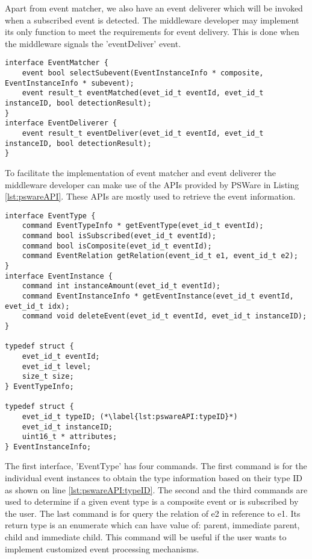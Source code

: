 Apart from event matcher, we also have an event deliverer which will be invoked when a subscribed event is detected. The middleware developer may implement its only function to meet the requirements for event delivery. This is done when the middleware signals the 'eventDeliver' event.
\begin{lstlisting}[caption=The event matcher interface, label=lst:pswareEventMatcher]
interface EventMatcher {
	event bool selectSubevent(EventInstanceInfo * composite, EventInstanceInfo * subevent);
	event result_t eventMatched(evet_id_t eventId, evet_id_t instanceID, bool detectionResult);
}
interface EventDeliverer {
	event result_t eventDeliver(evet_id_t eventId, evet_id_t instanceID, bool detectionResult);
}
\end{lstlisting}

To facilitate the implementation of event matcher and event deliverer the middleware developer can make use of the APIs provided by PSWare in Listing \ref{lst:pswareAPI}. These APIs are mostly used to retrieve the event information.
\begin{lstlisting}[caption=PSWare API in NesC, label=lst:pswareAPI]
interface EventType {
	command EventTypeInfo * getEventType(evet_id_t eventId);
	command bool isSubscribed(evet_id_t eventId);
	command bool isComposite(evet_id_t eventId);
	command EventRelation getRelation(event_id_t e1, event_id_t e2);
}
interface EventInstance {
	command int instanceAmount(evet_id_t eventId);
	command EventInstanceInfo * getEventInstance(evet_id_t eventId, evet_id_t idx);
	command void deleteEvent(evet_id_t eventId, evet_id_t instanceID);
}

typedef struct {
	evet_id_t eventId;
	evet_id_t level;
	size_t size;
} EventTypeInfo;

typedef struct {
	evet_id_t typeID; (*\label{lst:pswareAPI:typeID}*)
	evet_id_t instanceID;
	uint16_t * attributes;
} EventInstanceInfo;
\end{lstlisting}

The first interface, 'EventType' has four commands. The first command is for the individual event instances to obtain the type information based on their type ID as shown on line \ref{lst:pswareAPI:typeID}. The second and the third commands are used to determine if a given event type is a composite event or is subscribed by the user. The last command is for query the relation of e2 in reference to e1. Its return type is an enumerate which can have value of: parent, immediate parent, child and immediate child. This command will be useful if the user wants to implement customized event processing mechanisms.

